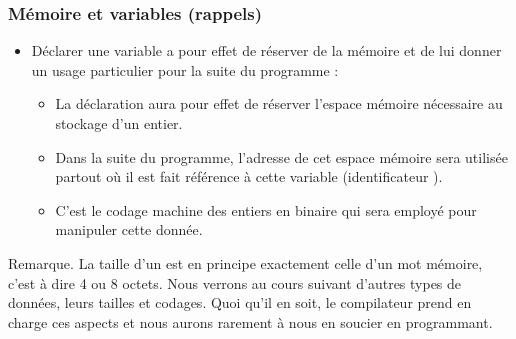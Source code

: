 \documentclass[xcolor=pdftex,svgnames,table]{beamer}
\begin{document}
\begin{frame}
  \frametitle{Mémoire et variables (rappels)\nowrite}
  \begin{itemize}
  \item Déclarer une variable a pour effet de réserver de la mémoire
    et de lui donner un usage particulier pour la suite du
    programme :\pause
    \begin{itemize}
    \item La déclaration  aura pour effet de réserver l'espace mémoire nécessaire au stockage d'un entier.
\pause
\item  Dans la suite du programme, l'adresse de cet espace mémoire sera utilisée partout où il est fait référence à cette variable (identificateur ).
\pause
\item C'est le codage machine des entiers en binaire qui sera employé pour manipuler cette donnée. 
   \end{itemize}\pause
  \end{itemize}
  \begin{block}{Remarque.\youwrite} 
    La  taille d'un  est en principe exactement celle d'un mot
    mémoire, c'est à dire 4 ou 8 octets. Nous
    verrons au cours suivant d'autres types de données, leurs tailles
    et codages. Quoi qu'il en soit, le
    compilateur prend en charge ces aspects et nous aurons rarement à
    nous en soucier en programmant.
\end{block}
\end{frame} 
\end{document}
